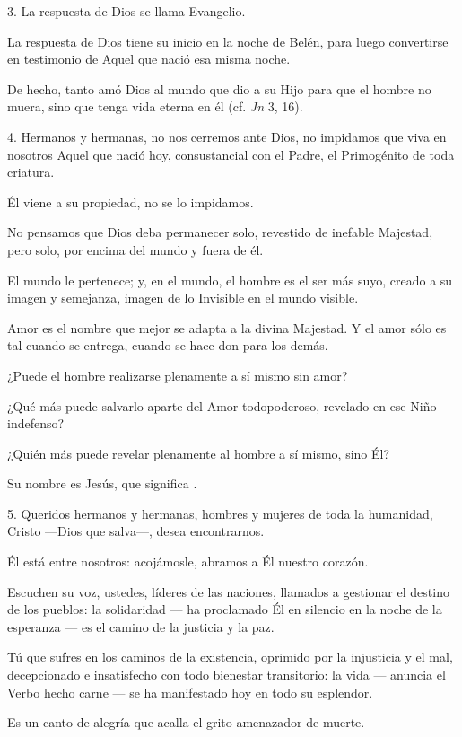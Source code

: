 \begin{body}
\begin{body}
		3. La respuesta de Dios se llama Evangelio.

		La respuesta de Dios tiene su inicio en la noche de Belén, para luego convertirse en testimonio de Aquel que nació esa misma noche.

		De hecho, tanto amó Dios al mundo que dio a su Hijo para que el hombre no muera, sino que tenga vida eterna en él (cf. \emph{Jn} 3, 16).

		4. Hermanos y hermanas, no nos cerremos ante Dios, no impidamos que viva en nosotros Aquel que nació hoy, consustancial con el Padre, el Primogénito de toda criatura.

		Él viene a su propiedad, no se lo impidamos.

		No pensamos que Dios deba permanecer solo, revestido de inefable Majestad, pero solo, por encima del mundo y fuera de él.

		El mundo le pertenece; y, en el mundo, el hombre es el ser más suyo, creado a su imagen y semejanza, imagen de lo Invisible en el mundo visible.

		Amor es el nombre que mejor se adapta a la divina Majestad. Y el amor sólo es tal cuando se entrega, cuando se hace don para los demás.

		¿Puede el hombre realizarse plenamente a sí mismo sin amor?

		¿Qué más puede salvarlo aparte del Amor todopoderoso, revelado en ese Niño indefenso?

		¿Quién más puede revelar plenamente al hombre a sí mismo, sino Él?

		Su nombre es Jesús, que significa .

		5. Queridos hermanos y hermanas, hombres y mujeres de toda la humanidad, Cristo ---Dios que salva---, desea encontrarnos.

		Él está entre nosotros: acojámosle, abramos a Él nuestro corazón.

		Escuchen su voz, ustedes, líderes de las naciones, llamados a gestionar el destino de los pueblos: la solidaridad --- ha proclamado Él en silencio en la noche de la esperanza --- es el camino de la justicia y la paz.

		Tú que sufres en los caminos de la existencia, oprimido por la injusticia y el mal, decepcionado e insatisfecho con todo bienestar transitorio: la vida --- anuncia el Verbo hecho carne --- se ha manifestado hoy en todo su esplendor.

		Es un canto de alegría que acalla el grito amenazador de muerte.


\end{body}
\end{body}
